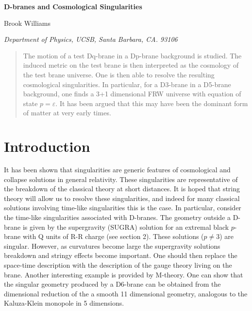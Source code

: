 \documentclass[a4paper,12pt]{article}
\newcommand{\ed}{\varepsilon}
\begin{document}
\renewcommand{\theequation}{\thesection.\arabic{equation}}
\begin{titlepage}
\bigskip
\rightline{} 
\bigskip\bigskip\bigskip\bigskip
\centerline{\Large \bf {D-branes and Cosmological Singularities}}
\bigskip\bigskip
\bigskip\bigskip

\centerline{\large Brook Williams}
\bigskip\bigskip
\centerline{\em Department of Physics, UCSB, Santa Barbara, CA. 93106}

\begin{abstract}
The motion of a test Dq-brane in a Dp-brane background is studied.
The induced metric on the test brane is then interpreted as the
cosmology of the test brane universe.  One is then able to resolve
the resulting cosmological singularities.  In particular, 
for a D3-brane in a D5-brane background, one finds a 3+1
dimensional FRW universe with equation of state $p = \ed$.  It has
been argued that this may have been the dominant form of matter at
very early times. 

\noindent
\end{abstract}
\end{titlepage}
\baselineskip=18pt \setcounter{footnote}{0}

%
%
%
\section{Introduction}
%
%
%
It has been shown that singularities are generic features of
cosmological and collapse solutions in general relativity.  These
singularities are representative of the breakdown of the classical
theory at short distances.  It is hoped that string theory will allow
us to resolve these singularities, and indeed for many classical
solutions involving time-like singularities this is the case.
In particular, consider the time-like singularities associated with
D-branes.  The geometry outside a D-brane is given by the supergravity (SUGRA)
solution for an extremal black $p$-brane with Q units of R-R charge
(see section 2).
These solutions ($p \ne 3$) are singular.  However, as curvatures
become large the supergravity solutions breakdown and 
stringy effects become important.  One should then replace 
the space-time description with
the description of the gauge theory living on the brane.  Another
interesting example is provided by M-theory.  One
can show that the singular geometry produced by a D6-brane can be
obtained from the dimensional reduction of the a smooth 11
dimensional geometry, analogous to the Kaluza-Klein monopole in 5 dimensions.
\end{document}
